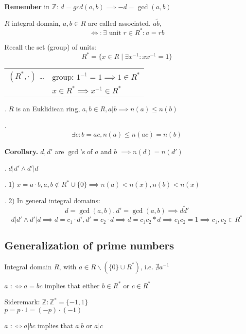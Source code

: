 \textbf{Remember}
in $\mathbb{Z}$: $d = gcd(a,b) \implies -d = \gcd(a,b)$

\begin{definition}
$R$ integral domain, 
$a,b \in R$ are called associated, $a \tilde b$,
\[
  \Leftrightarrow: \exists \text{ unit } r \in R^{*}: a = rb
\]
\end{definition}

Recall the set (group) of units:
\[
  R^{*} = \{ x \in R \mid \exists x^{-1} : xx^{-1} = 1\}
\]
\begin{tabular}{ll}
  $(R^{*}, \cdot)$ \ldots 
    & group: $1^{-1} = 1 \implies 1 \in R^{*}$ \\
    & $x\in R^{*} \implies x^{-1} \in R^{*}$
\end{tabular}

\Theorem.
$R$ is an Euklidiean ring, $a,b\in R, a|b \implies n(a) \leq n(b)$

\Proof.
\begin{align*}
  \exists c : b = ac, n(a) \leq n(ac) = n(b)
\end{align*}

\textbf{Corollary.}
$d, d'$ are $\gcd$'s of $a$ and $b$ $\implies n(d) = n(d')$

\Proof.
$d|d' \land d' | d$


\Remark.
1) $x = a\cdot b, a,b\not\in R^{*} \cup \{0\} \implies n(a) < n(x), n(b) < n(x)$

\Remark.
2) In general integral domains: 
\[
  d= \gcd(a,b), d' = \gcd(a,b) \implies d \tilde d'
\]
\[
  d|d' \land d'|d \implies d = c_1\cdot d', d' = c_2 \cdot d 
  \implies d = c_1c_2 *d \implies c_1 c_2 = 1
  \implies c_1,c_2 \in R^{*}
\]

\subsection{Generalization of prime numbers}
\begin{definition}
  Integral domain $R$, with $a\in R \backslash (\{0\}\cup R^{*})$, i.e. $\nexists a^{-1}$

$a$  $:\Leftrightarrow a = bc$ implies that either $b\in R^{*}$ or $c\in R^{*}$

Sideremark: 
$\mathbb{Z}: \mathbb{Z}^{*} = \{-1, 1\}$ \\
$p = p \cdot 1 = (-p) \cdot (-1)$

$a$  $:\Leftrightarrow a | bc$ implies that $a|b$ or $a|c$
\end{definition}

